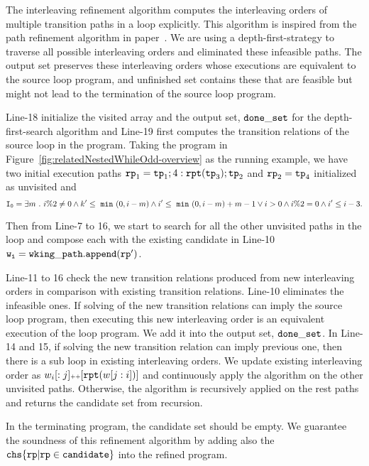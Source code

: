 The interleaving refinement algorithm computes the interleaving orders of multiple transition paths in a loop explicitly.
This algorithm is inspired from the path refinement algorithm in paper~\cite{GulwaniJK09}. 
We are using a depth-first-strategy to traverse all possible interleaving orders and eliminated these infeasible paths. The output set 
preserves these interleaving orders whose executions are equivalent to the source loop program, and unfinished
set contains these that are feasible but might not lead to the termination of the source loop program.

Line-18 initialize the visited array and the output set, $\mathtt{done\_set}$ for the depth-first-search algorithm and Line-19 first computes the transition relations of the source loop in the program.
Taking the program in Figure~\ref{fig:relatedNestedWhileOdd-overview} as the running example,
we have two initial execution paths $\mathtt{rp}_1 = \mathtt{tp}_1; 4:\mathtt{rpt}(\mathtt{tp}_3);\mathtt{tp}_2$ and $\mathtt{rp}_2 =\mathtt{tp}_4$ initialized as unvisited
and 
\[
   \mathtt{I_0} = \exists m ~.~ i \%2 \neq 0 \land k' \leq ~\mathtt{min}~(0, i - m) 
   \land i' \leq ~\mathtt{min}~(0, i - m) + m - 1 \lor  i > 0 \land i \%2 = 0 \land  i' \leq i - 3.
\]

Then from Line-7 to 16, we start to search for all the other unvisited paths  in the loop
and compose each with the existing candidate in Line-10 $\mathtt{w_i = wking\_path.append(\mathtt{rp}')}$.

Line-11 to 16 check the new transition relations produced from new
interleaving orders in comparison with existing transition relations.
Line-10 eliminates the infeasible ones.
If solving of the new transition relations can imply the source loop program,
then executing this new interleaving order is an equivalent execution of the loop program. We add it into the output set, $\mathtt{done\_set}$.
In Line-14 and 15, if solving the new transition relation can imply previous one, then there is a sub loop
in existing interleaving orders. We update existing interleaving order
as $w_i[:j] {\scriptscriptstyle ++} [\mathtt{rpt}(w[j:i])]$ and continuously apply the algorithm on the other unvisited paths.
Otherwise, the algorithm is recursively applied on the rest paths and returns the candidate set from recursion.

In the terminating program, the candidate set should be empty. We guarantee the soundness of this refinement algorithm
by adding also the $\rpchoose{ \rprog \vert \rprog \in \kw{candidate}}$ into the refined program.


